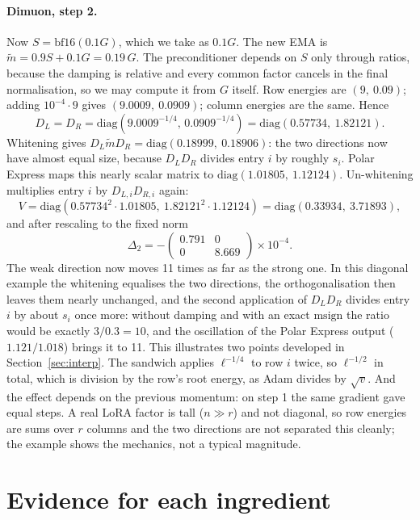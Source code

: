 \documentclass[11pt]{article}
\newcommand{\msign}{\mathrm{msign}}
\newcommand{\diag}{\mathrm{diag}}
\newcommand{\bfs}{\mathrm{bf16}}
\begin{document}
\paragraph{Dimuon, step 2.} Now $S=\bfs(0.1G)$, which we take as $0.1G$. The new EMA is
$\tilde m=0.9S+0.1G=0.19\,G$. The preconditioner depends on $S$ only through ratios, because the
damping is relative and every common factor cancels in the final normalisation, so we may compute it
from $G$ itself. Row energies are $(9,\ 0.09)$; adding $10^{-4}\cdot9$ gives $(9.0009,\ 0.0909)$;
column energies are the same. Hence
\[
D_L=D_R=\diag(9.0009^{-1/4},\,0.0909^{-1/4})=\diag(0.57734,\ 1.82121).
\]
Whitening gives $D_L\tilde mD_R=\diag(0.18999,\ 0.18906)$: the two directions now have almost equal
size, because $D_LD_R$ divides entry $i$ by roughly $s_i$. Polar Express maps this nearly scalar
matrix to $\diag(1.01805,\ 1.12124)$. Un-whitening multiplies entry $i$ by $D_{L,i}D_{R,i}$ again:
\[
V=\diag(0.57734^2\cdot1.01805,\ 1.82121^2\cdot1.12124)=\diag(0.33934,\ 3.71893),
\]
and after rescaling to the fixed norm
\[
\Delta_2=-\begin{pmatrix}0.791&0\\0&8.669\end{pmatrix}\times10^{-4}.
\]
The weak direction now moves 11 times as far as the strong one. In this diagonal example the
whitening equalises the two directions, the orthogonalisation then leaves them nearly unchanged,
and the second application of $D_LD_R$ divides entry $i$ by about $s_i$ once more: without damping
and with an exact $\msign$ the ratio would be exactly $3/0.3=10$, and the oscillation of the Polar
Express output ($1.121/1.018$) brings it to 11. This illustrates two points developed in
Section~\ref{sec:interp}. The sandwich applies $\ell^{-1/4}$ to row $i$ twice, so $\ell^{-1/2}$ in
total, which is division by the row's root energy, as Adam divides by $\sqrt v$. And the effect
depends on the previous momentum: on step 1 the same gradient gave equal steps. A real LoRA factor
is tall ($n\gg r$) and not diagonal, so row energies are sums over $r$ columns and the two
directions are not separated this cleanly; the example shows the mechanics, not a typical
magnitude.

\section{Evidence for each ingredient}\label{sec:evidence}
\end{document}
